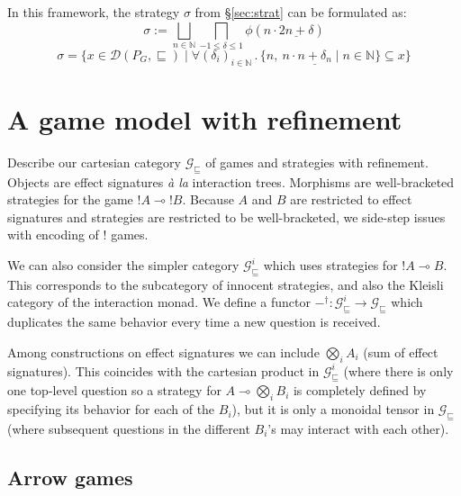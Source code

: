 \documentclass[format=sigplan,authordraft]{acmart}
\newcommand{\gcat}{\mathcal{G}_{\sqsubseteq}}
\begin{document}
In this framework,
the strategy $\sigma$ from \S\ref{sec:strat}
can be formulated as:
\[
  \sigma :=
    \bigsqcup_{n \in \mathbb{N}}
    \bigsqcap_{-1 \le \delta \le 1}
    \phi(n \cdot \underline{2n + \delta})
\]
\[
  \sigma =
    \{ x \in \mathcal{D}(P_G, {\sqsubseteq}) \mid
       \forall (\delta_i)_{i \in \mathbb{N}} \,.\,
       \{ n, \: n \cdot \underline{n + \delta_n} \mid
          n \in \mathbb{N} \} \subseteq x \}
\]



\section{A game model with refinement} %

Describe our cartesian category $\gcat$
of games and strategies with refinement.
Objects are effect signatures \emph{\`a la} interaction trees.
Morphisms are well-bracketed strategies for
the game ${!A} \multimap {!B}$.
Because $A$ and $B$ are restricted to effect signatures and
strategies are restricted to be well-bracketed,
we side-step issues with encoding of $!$ games.

We can also consider the simpler category
$\gcat^i$
which uses strategies for ${!A} \multimap B$.
This corresponds to the subcategory of innocent strategies,
and also the Kleisli category of the interaction monad.
We define a functor
$-^\dagger : \gcat^i \rightarrow \gcat$
which duplicates the same behavior
every time a new question is received.

Among constructions on effect signatures we can include
$\bigotimes_i A_i$ (sum of effect signatures).
This coincides with the cartesian product in $\gcat^i$
(where there is only one top-level question
so a strategy for $A \multimap \bigotimes_i B_i$
is completely defined
by specifying its behavior for each of the $B_i$),
but it is only a monoidal tensor in $\gcat$
(where subsequent questions in the different $B_i$'s
may interact with each other).

\subsection{Arrow games} %
\label{sec:arrow}
\end{document}
